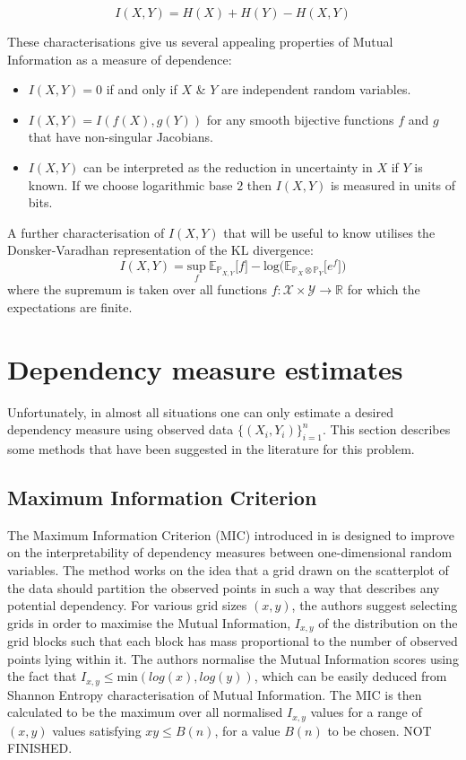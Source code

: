 \documentclass[a4paper]{article}
\begin{document}
$$I(X,Y)=H(X)+H(Y)-H(X,Y)$$

These characterisations give us several appealing properties of Mutual Information as a measure of dependence:
\begin{itemize}
\item $I(X,Y)=0$ if and only if $X$ \& $Y$ are independent random variables.
\item $I(X,Y)=I(f(X),g(Y))$ for any smooth bijective functions $f$ and $g$ that have non-singular Jacobians.
\item $I(X,Y)$ can be interpreted as the reduction in uncertainty in $X$ if $Y$ is known. If we choose logarithmic base $2$ then $I(X,Y)$ is measured in units of bits.
\end{itemize}

A further characterisation of $I(X,Y)$ that will be useful to know utilises the Donsker-Varadhan representation of the $\text{KL}$ divergence:
$$I(X,Y)=\underset{f}{\text{sup}}\ \mathbb{E}_{\mathbb{P}_{X,Y}}\big[f\big]-\text{log}\big(\mathbb{E}_{\mathbb{P}_{X}\otimes\mathbb{P}_Y}\big[e^{f}\big]\big)$$
where the supremum is taken over all functions $f: \mathcal{X}\times\mathcal{Y}\rightarrow\mathbb{R}$ for which the expectations are finite.

\section{Dependency measure estimates}
Unfortunately, in almost all situations one can only estimate a desired dependency measure using observed data $\{(X_i,Y_i)\}_{i=1}^{n}$. This section describes some methods that have been suggested in the literature for this problem.
\subsection{Maximum Information Criterion}
The Maximum Information Criterion (MIC) introduced in \citep{Reshef} is designed to improve on the interpretability of dependency measures between one-dimensional random variables. The method works on the idea that a grid drawn on the scatterplot of the data should partition the observed points in such a way that describes any potential dependency. For various grid sizes $(x,y)$, the authors suggest selecting grids in order to maximise the Mutual Information, $I_{x,y}$ of the distribution on the grid blocks such that each block has mass proportional to the number of observed points lying within it. The authors normalise the Mutual Information scores using the fact that $I_{x,y}\leq \text{min}(log(x),log(y))$, which can be easily deduced from Shannon Entropy characterisation of Mutual Information. The $\text{MIC}$ is then calculated to be the maximum over all normalised $I_{x,y}$ values for a range of $(x,y)$ values satisfying $xy\leq B(n)$, for a value $B(n)$ to be chosen. NOT FINISHED.
\end{document}
